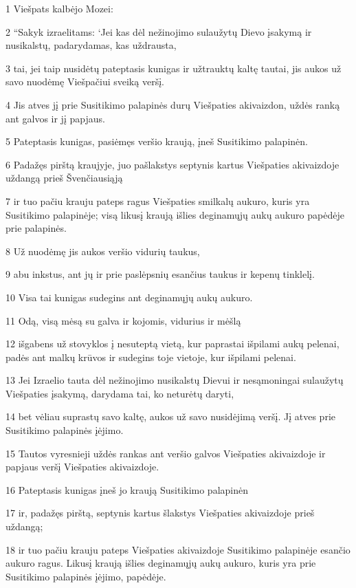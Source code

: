 \par 1 Viešpats kalbėjo Mozei: 
\par 2 “Sakyk izraelitams: ‘Jei kas dėl nežinojimo sulaužytų Dievo įsakymą ir nusikalstų, padarydamas, kas uždrausta, 
\par 3 tai, jei taip nusidėtų pateptasis kunigas ir užtrauktų kaltę tautai, jis aukos už savo nuodėmę Viešpačiui sveiką veršį. 
\par 4 Jis atves jį prie Susitikimo palapinės durų Viešpaties akivaizdon, uždės ranką ant galvos ir jį papjaus. 
\par 5 Pateptasis kunigas, pasiėmęs veršio kraują, įneš Susitikimo palapinėn. 
\par 6 Padažęs pirštą kraujyje, juo pašlakstys septynis kartus Viešpaties akivaizdoje uždangą prieš Švenčiausiąją 
\par 7 ir tuo pačiu krauju pateps ragus Viešpaties smilkalų aukuro, kuris yra Susitikimo palapinėje; visą likusį kraują išlies deginamųjų aukų aukuro papėdėje prie palapinės. 
\par 8 Už nuodėmę jis aukos veršio vidurių taukus, 
\par 9 abu inkstus, ant jų ir prie paslėpsnių esančius taukus ir kepenų tinklelį. 
\par 10 Visa tai kunigas sudegins ant deginamųjų aukų aukuro. 
\par 11 Odą, visą mėsą su galva ir kojomis, vidurius ir mėšlą 
\par 12 išgabens už stovyklos į nesuteptą vietą, kur paprastai išpilami aukų pelenai, padės ant malkų krūvos ir sudegins toje vietoje, kur išpilami pelenai. 
\par 13 Jei Izraelio tauta dėl nežinojimo nusikalstų Dievui ir nesąmoningai sulaužytų Viešpaties įsakymą, darydama tai, ko neturėtų daryti, 
\par 14 bet vėliau suprastų savo kaltę, aukos už savo nusidėjimą veršį. Jį atves prie Susitikimo palapinės įėjimo. 
\par 15 Tautos vyresnieji uždės rankas ant veršio galvos Viešpaties akivaizdoje ir papjaus veršį Viešpaties akivaizdoje. 
\par 16 Pateptasis kunigas įneš jo kraują Susitikimo palapinėn 
\par 17 ir, padažęs pirštą, septynis kartus šlakstys Viešpaties akivaizdoje prieš uždangą; 
\par 18 ir tuo pačiu krauju pateps Viešpaties akivaizdoje Susitikimo palapinėje esančio aukuro ragus. Likusį kraują išlies deginamųjų aukų aukuro, kuris yra prie Susitikimo palapinės įėjimo, papėdėje. 
